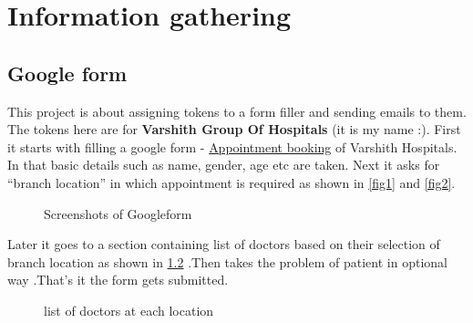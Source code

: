 \documentclass{report}
\begin{document}
\chapter{Information gathering}
\section{Google form}
This project is about assigning tokens to a form filler and sending emails to them. The tokens here are for \textbf{Varshith Group Of Hospitals} (it is my name :). First it starts with filling a google form - \href{https://docs.google.com/forms/d/e/1FAIpQLSchUr83psJBTp3G_Mh1Mi20ATDMxm-hGJr-776OOu7rAujDtg/viewform?usp=sf_link}{Appointment booking} of Varshith Hospitals. In that basic details such as name, gender, age etc are taken. Next it asks for \enquote{branch location} in which appointment is required as shown in \ref{fig1} and \ref{fig2}.
\begin{figure}[h]
    \centering
    \hfill
    \caption{Screenshots of Googleform}
    \label{fig:gf}
\end{figure}

Later it goes to a section containing list of doctors based on their selection of branch location as shown in \ref{fig:doctots_list} .Then takes the problem of patient in optional way .That's it the form gets submitted.
\begin{figure}
    \centering
    \hfill
    \hfill
    \hfill
    \hfill
    \hfill
    \caption{list of doctors at each location}
    \label{fig:doctots_list}
\end{figure}
\end{document}
